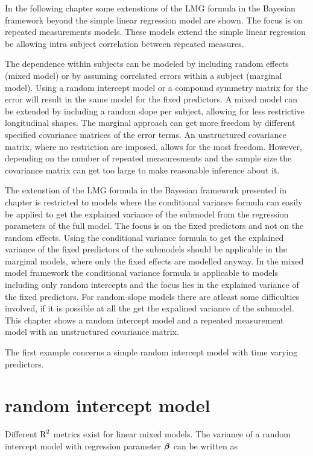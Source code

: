 \documentclass[11pt,a4paper,twoside]{book}\usepackage[]{graphicx}\usepackage[]{color}
\begin{document}
In the following chapter some extenstions of the LMG formula in the Bayesian framework beyond the simple linear regression model are shown. The focus is on repeated measurements models. These models extend the simple linear regression be allowing intra subject correlation between repeated measures. 

The dependence within subjects can be modeled by including random effects (mixed model) or by assuming correlated errors within a subject (marginal model). Using a random intercept model or a compound symmetry matrix for the error will result in the same model for the fixed predictors. A mixed model can be extended by including a random slope per subject, allowing for less restrictive longitudinal shapes. The marginal approach can get more freedom by different specified covariance matrices of the error terms. An unstructured covariance matrix, where no restriction are imposed, allows for the most freedom. However, depending on the number of repeated measuresments and the sample size the covariance matrix can get too large to make reasonable inference about it. 


The extenstion of the LMG formula in the Bayesian framework presented in chapter is restricted to models where the conditional variance formula can easily be applied to get the explained variance of the submodel from the regression parameters of the full model. The focus is on the fixed predictors and not on the random effects. Using the conditional variance formula to get the explained variance of the fixed predictors of the submodels should be applicable in the marginal models, where only the fixed effects are modelled anyway. In the mixed model framework the conditional variance formula is applicable to models including only random intercepts and the focus lies in the explained variance of the fixed predictors. For random-slope models there are atleast some difficulties involved, if it is possible at all the get the expalined variance of the submodel. This chapter shows a  random intercept model and a repeated measurement model with an unstructured covariance matrix.  

The first example concerns a simple random intercept model with time varying predictors.  

\section{random intercept model}

Different $\text{R}^2$ metrics exist for linear mixed models. The variance of a random intercept model with regression parameter ${\boldsymbol{\beta}}$ can be written as
\end{document}
